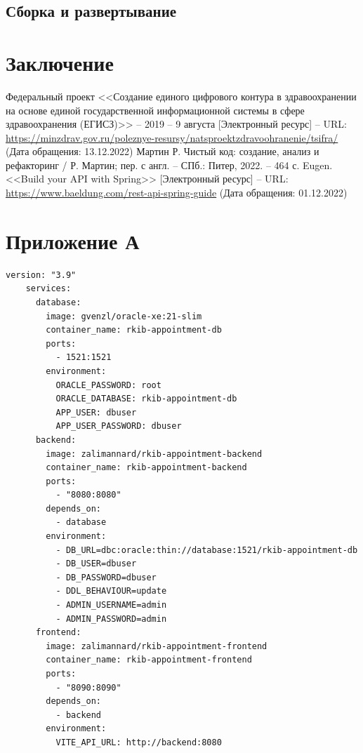 \documentclass[a4paper,article]{article}
\begin{document}
\begin{sloppypar}
    \newpage

    \subsection{Сборка и развертывание}\label{Реализация. Сборка и развертывание}

    \newpage

    \section*{Заключение}

    \newpage


    \begin{thebibliography}{}
         Федеральный проект <<Создание единого цифрового контура в здравоохранении на основе единой государственной информационной системы в сфере здравоохранения (ЕГИСЗ)>> -- 2019 -- 9 августа [Электронный ресурс] -- URL: \url{https://minzdrav.gov.ru/poleznye-resursy/natsproektzdravoohranenie/tsifra/} (Дата обращения: 13.12.2022)
         Мартин Р. Чистый код: создание, анализ и рефакторинг / Р. Мартин; пер. с англ. -- СПб.: Питер, 2022. -- 464 с.
         Eugen. <<Build your API with Spring>> [Электронный ресурс] -- URL: \url{https://www.baeldung.com/rest-api-spring-guide} (Дата обращения: 01.12.2022)
    \end{thebibliography}
    
    \newpage
    
    \appendix
    
    \section*{Приложение А}
    
    \begin{lstlisting}[]
    version: "3.9"
    services:
      database:
        image: gvenzl/oracle-xe:21-slim
        container_name: rkib-appointment-db
        ports:
          - 1521:1521
        environment:
          ORACLE_PASSWORD: root
          ORACLE_DATABASE: rkib-appointment-db
          APP_USER: dbuser
          APP_USER_PASSWORD: dbuser
      backend:
        image: zalimannard/rkib-appointment-backend
        container_name: rkib-appointment-backend
        ports:
          - "8080:8080"
        depends_on:
          - database
        environment:
          - DB_URL=dbc:oracle:thin://database:1521/rkib-appointment-db
          - DB_USER=dbuser
          - DB_PASSWORD=dbuser
          - DDL_BEHAVIOUR=update
          - ADMIN_USERNAME=admin
          - ADMIN_PASSWORD=admin
      frontend:
        image: zalimannard/rkib-appointment-frontend
        container_name: rkib-appointment-frontend
        ports:
          - "8090:8090"
        depends_on:
          - backend
        environment:
          VITE_API_URL: http://backend:8080
    \end{lstlisting}

\end{sloppypar}
\end{document}
